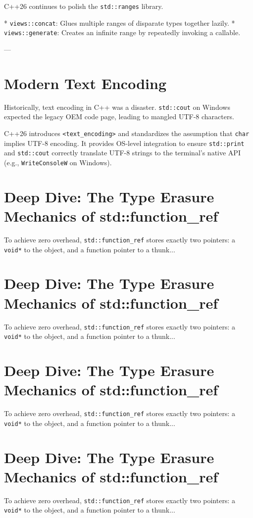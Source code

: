 C++26 continues to polish the \texttt{std::ranges} library.

*   \texttt{views::concat}: Glues multiple ranges of disparate types together lazily.
*   \texttt{views::generate}: Creates an infinite range by repeatedly invoking a callable.

---

\section{Modern Text Encoding}

Historically, text encoding in C++ was a disaster. \texttt{std::cout} on Windows expected the legacy OEM code page, leading to mangled UTF-8 characters.

C++26 introduces \texttt{<text_encoding>} and standardizes the assumption that \texttt{char} implies UTF-8 encoding. It provides OS-level integration to ensure \texttt{std::print} and \texttt{std::cout} correctly translate UTF-8 strings to the terminal's native API (e.g., \texttt{WriteConsoleW} on Windows).


\section{Deep Dive: The Type Erasure Mechanics of std::function_ref}
To achieve zero overhead, \texttt{std::function_ref} stores exactly two pointers: a \texttt{void*} to the object, and a function pointer to a thunk...

\section{Deep Dive: The Type Erasure Mechanics of std::function_ref}
To achieve zero overhead, \texttt{std::function_ref} stores exactly two pointers: a \texttt{void*} to the object, and a function pointer to a thunk...

\section{Deep Dive: The Type Erasure Mechanics of std::function_ref}
To achieve zero overhead, \texttt{std::function_ref} stores exactly two pointers: a \texttt{void*} to the object, and a function pointer to a thunk...

\section{Deep Dive: The Type Erasure Mechanics of std::function_ref}
To achieve zero overhead, \texttt{std::function_ref} stores exactly two pointers: a \texttt{void*} to the object, and a function pointer to a thunk...

